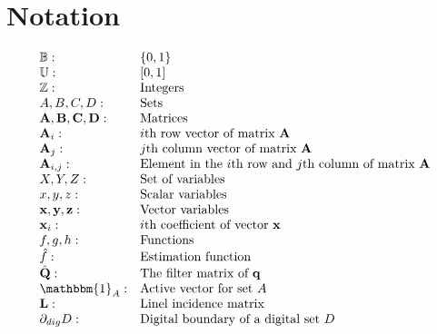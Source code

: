 \chapter{Notation}
\label{chapter:notation}

\[
\begin{array}{ll}
\mathbb{B}: & \{0,1\}\\
\mathbb{U}: & [0,1]\\
\mathbb{Z}: & \text{Integers}\\
A,B,C,D: & \text{Sets}\\
\mathbf{A,B,C,D}: & \text{Matrices}\\
\mathbf{A}_i: & \text{$i$th row vector of matrix $\mathbf{A}$}\\
\mathbf{A}_j: & \text{$j$th column vector of matrix $\mathbf{A}$}\\
\mathbf{A}_{i,j}: & \text{Element in the $i$th row and $j$th column of matrix $\mathbf{A}$}\\
X,Y,Z: & \text{Set of variables}\\
x,y,z: & \text{Scalar variables}\\
\mathbf{x,y,z}: & \text{Vector variables}\\
\mathbf{x}_i: & \text{$i$th coefficient of vector $\mathbf{x}$}\\
f,g,h: & \text{Functions}\\
\hat{f}: & \text{Estimation function}\\
\hat{\mathbf{Q}}: & \text{The filter matrix of $\mathbf{q}$}\\
\mathbbm{1}_A: & \text{Active vector for set $A$}\\
\mathbf{L}: & \text{Linel incidence matrix}\\
\partial_{dig} D: & \text{Digital boundary of a digital set $D$}
\end{array}
\]
